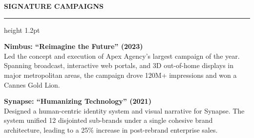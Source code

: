 \documentclass[10pt]{article}
\newcommand{\cvsection}[1]{%
  \vspace{1.2em}%
  {\fontsize{11}{13}\selectfont\color{primary}\textbf{\MakeUppercase{#1}}}\\[0.3em]%
  {\color{accent}\hrule height 1.2pt}%
  \vspace{0.8em}%
}
\begin{document}
\begin{minipage}[t]{0.67\textwidth}
  \cvsection{Signature Campaigns}
  
  \fontsize{9}{11}\selectfont%
  \textbf{Nimbus: ``Reimagine the Future'' (2023)} \\
  \fontsize{8.5}{11}\selectfont\color{secondary}%
  Led the concept and execution of Apex Agency's largest campaign of the year. Spanning broadcast, interactive web portals, and 3D out-of-home displays in major metropolitan areas, the campaign drove 120M+ impressions and won a Cannes Gold Lion.
  
  \vspace{0.5em}
  
  \fontsize{9}{11}\selectfont%
  \textbf{Synapse: ``Humanizing Technology'' (2021)} \\
  \fontsize{8.5}{11}\selectfont\color{secondary}%
  Designed a human-centric identity system and visual narrative for Synapse. The system unified 12 disjointed sub-brands under a single cohesive brand architecture, leading to a 25\% increase in post-rebrand enterprise sales.
\end{minipage}
\end{document}
